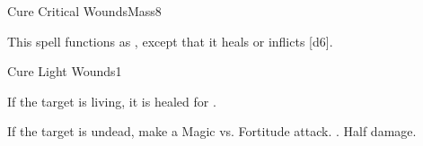 \begin{spellsection}{Cure Critical Wounds}{Mass}{8}
\begin{spellheader}
\end{spellheader}
\begin{spellcontent}
    \begin{spelltargetinginfo}
    \end{spelltargetinginfo}
    \begin{spelleffects}
        \spellspecial This spell functions as , except that it heals or inflicts [d6].
    \end{spelleffects}
\end{spellcontent}
\begin{spellfooter}
\end{spellfooter}
\end{spellsection}

\begin{spellsection}{Cure Light Wounds}{1}
\begin{spellheader}
\end{spellheader}
\begin{spellcontent}
    \begin{spelltargetinginfo}
    \end{spelltargetinginfo}
    \begin{spelleffects}
        \spelleffect If the target is living, it is healed for .
        \begin{spellattacktriggered}{If the target is undead, make a Magic vs. Fortitude attack.}
            \spellsuccess {}.
            \spellfailure Half damage.
        \end{spellattacktriggered}
    \end{spelleffects}
\end{spellcontent}
\begin{spellfooter}
\end{spellfooter}
\end{spellsection}

